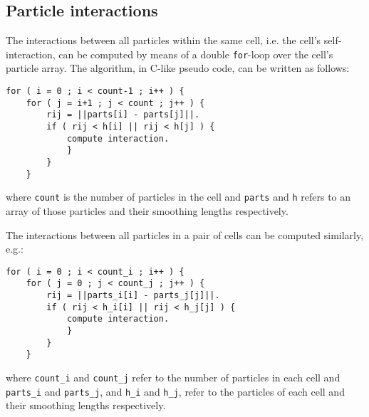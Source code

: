 \documentclass[final]{siamltex}
\begin{document}
\subsection{Particle interactions}

The interactions between all particles within the same cell,
i.e. the cell's self-interaction, can be computed by means of
a double {\tt for}-loop over the cell's particle array.
The algorithm, in C-like pseudo code, can be written as follows:

\begin{center}\begin{minipage}{0.8\textwidth}
    \begin{lstlisting}
for ( i = 0 ; i < count-1 ; i++ ) {
    for ( j = i+1 ; j < count ; j++ ) {
        rij = ||parts[i] - parts[j]||.
        if ( rij < h[i] || rij < h[j] ) {
            compute interaction.
            }
        }
    }
    \end{lstlisting}
\end{minipage}\end{center}

\noindent where {\tt count} is the number of particles in the
cell and {\tt parts} and {\tt h} refers to an array of those
particles and their smoothing lengths respectively.

The interactions between all particles in a pair of cells
can be computed similarly, e.g.:
   
\begin{center}\begin{minipage}{0.8\textwidth}
    \begin{lstlisting}
for ( i = 0 ; i < count_i ; i++ ) {
    for ( j = 0 ; j < count_j ; j++ ) {
        rij = ||parts_i[i] - parts_j[j]||.
        if ( rij < h_i[i] || rij < h_j[j] ) {
            compute interaction.
            }
        }
    }
    \end{lstlisting}
\end{minipage}\end{center}

\noindent where {\tt count\_i} and {\tt count\_j} refer to
the number of particles in each cell and {\tt parts\_i} and
{\tt parts\_j}, and {\tt h\_i} and {\tt h\_j}, refer to the
particles of each cell and their smoothing lengths respectively.
\end{document}
